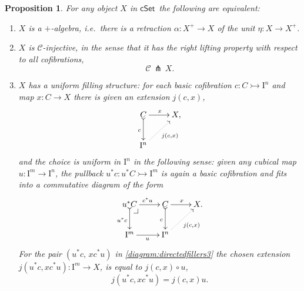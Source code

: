 \documentclass[11pt]{article}
\makeatletter
\newcommand{\cSet}{\ensuremath{\mathsf{cSet}}}
\newcommand{\pbcorner}[1][dr]{\save*!/#1-1.2pc/#1:(-1,1)@^{|-}\restore}
\newcommand{\mono}{\ensuremath{\rightarrowtail}}
\newcommand{\ra}{\ensuremath{\rightarrow}}
\newcommand{\I}{\ensuremath{\mathrm{I}}}
\newtheorem{proposition}[theorem]{Proposition}
\theoremstyle{remark}
\theoremstyle{definition}
\makeatother
\begin{document}
\begin{proposition}\label{prop:uniformstructequiv} For any object $X$ in \cSet\ the following are equivalent:
\begin{enumerate}
\item $X$ is a \emph{$+$-algebra}, i.e.\ there is a retraction $\alpha :X^+ \to X$ of the unit $\eta : X\to X^+$.
\item $X$ is  \emph{$\mathcal{C}$-injective}, in the sense that it has the right lifting property with respect to all cofibrations,
\[
\mathcal{C}\, \pitchfork\,X.
\]
\item $X$ has a \emph{uniform filling structure}: 
for each basic cofibration $c : C \mono \I^{n}$ and map $x : C\ra X$ there is given an extension $j(c,x)$,
\begin{equation}\label{diagram:directedfillers}
\xymatrix{
C \ar@{>->}[d]_{c} \ar[r]^{x} & X, \\
\I^{n}\ar@{.>}[ru]_{j(c,x)} &
}
\end{equation}
and the choice is \emph{uniform in $\I^n$} in the following sense: given any cubical map $u : \I^m \ra \I^n$, the pullback $u^*c : u^*C\mono \I^m$ is again a basic cofibration and fits into a commutative diagram of the form
\begin{equation}\label{diagram:directedfillers3}
\xymatrix{
u^*C \ar@{>->}[d]_{u^*c} \ar[r]^{c^*u} \pbcorner &  C \ar@{>->}[d]_{c} \ar[r]^{x} & X. \\
\I^{m} \ar[r]_{u} & \I^{n} \ar@{.>}[ru]_{j(c,x)} &
}
\end{equation}
For the pair $(u^*c,\, xc^*u)$ in \eqref{diagram:directedfillers3} the chosen extension $j(u^*c,xc^*u): \I^m \ra X$, is equal to  $j(c,x)\circ u$,
\begin{equation}\label{eq:uniformfillers}
j(u^*c,xc^*u) = j(c,x) u.
\end{equation}
\end{enumerate}
\end{proposition}
\end{document}
